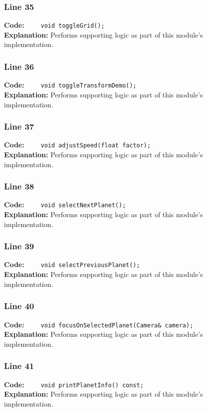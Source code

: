 \documentclass[11pt,a4paper]{article}
\begin{document}
\subsubsection*{Line 35}
\textbf{Code:} \verb|    void toggleGrid();|\\
\textbf{Explanation:} Performs supporting logic as part of this module's implementation.

\subsubsection*{Line 36}
\textbf{Code:} \verb|    void toggleTransformDemo();|\\
\textbf{Explanation:} Performs supporting logic as part of this module's implementation.

\subsubsection*{Line 37}
\textbf{Code:} \verb|    void adjustSpeed(float factor);|\\
\textbf{Explanation:} Performs supporting logic as part of this module's implementation.

\subsubsection*{Line 38}
\textbf{Code:} \verb|    void selectNextPlanet();|\\
\textbf{Explanation:} Performs supporting logic as part of this module's implementation.

\subsubsection*{Line 39}
\textbf{Code:} \verb|    void selectPreviousPlanet();|\\
\textbf{Explanation:} Performs supporting logic as part of this module's implementation.

\subsubsection*{Line 40}
\textbf{Code:} \verb|    void focusOnSelectedPlanet(Camera& camera);|\\
\textbf{Explanation:} Performs supporting logic as part of this module's implementation.

\subsubsection*{Line 41}
\textbf{Code:} \verb|    void printPlanetInfo() const;|\\
\textbf{Explanation:} Performs supporting logic as part of this module's implementation.
\end{document}
